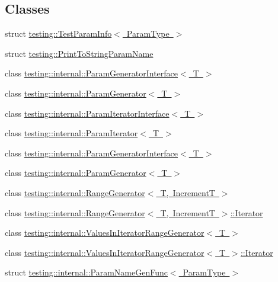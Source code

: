 \subsection*{Classes}
\begin{DoxyCompactItemize}
\item 
struct \mbox{\hyperlink{structtesting_1_1_test_param_info}{testing\+::\+Test\+Param\+Info$<$ Param\+Type $>$}}
\item 
struct \mbox{\hyperlink{structtesting_1_1_print_to_string_param_name}{testing\+::\+Print\+To\+String\+Param\+Name}}
\item 
class \mbox{\hyperlink{classtesting_1_1internal_1_1_param_generator_interface}{testing\+::internal\+::\+Param\+Generator\+Interface$<$ T $>$}}
\item 
class \mbox{\hyperlink{classtesting_1_1internal_1_1_param_generator}{testing\+::internal\+::\+Param\+Generator$<$ T $>$}}
\item 
class \mbox{\hyperlink{classtesting_1_1internal_1_1_param_iterator_interface}{testing\+::internal\+::\+Param\+Iterator\+Interface$<$ T $>$}}
\item 
class \mbox{\hyperlink{classtesting_1_1internal_1_1_param_iterator}{testing\+::internal\+::\+Param\+Iterator$<$ T $>$}}
\item 
class \mbox{\hyperlink{classtesting_1_1internal_1_1_param_generator_interface}{testing\+::internal\+::\+Param\+Generator\+Interface$<$ T $>$}}
\item 
class \mbox{\hyperlink{classtesting_1_1internal_1_1_param_generator}{testing\+::internal\+::\+Param\+Generator$<$ T $>$}}
\item 
class \mbox{\hyperlink{classtesting_1_1internal_1_1_range_generator}{testing\+::internal\+::\+Range\+Generator$<$ T, Increment\+T $>$}}
\item 
class \mbox{\hyperlink{classtesting_1_1internal_1_1_range_generator_1_1_iterator}{testing\+::internal\+::\+Range\+Generator$<$ T, Increment\+T $>$\+::\+Iterator}}
\item 
class \mbox{\hyperlink{classtesting_1_1internal_1_1_values_in_iterator_range_generator}{testing\+::internal\+::\+Values\+In\+Iterator\+Range\+Generator$<$ T $>$}}
\item 
class \mbox{\hyperlink{classtesting_1_1internal_1_1_values_in_iterator_range_generator_1_1_iterator}{testing\+::internal\+::\+Values\+In\+Iterator\+Range\+Generator$<$ T $>$\+::\+Iterator}}
\item 
struct \mbox{\hyperlink{structtesting_1_1internal_1_1_param_name_gen_func}{testing\+::internal\+::\+Param\+Name\+Gen\+Func$<$ Param\+Type $>$}}

\end{DoxyCompactItemize}
